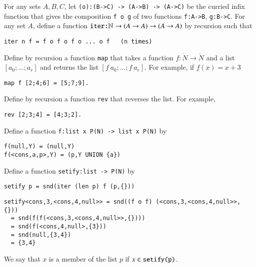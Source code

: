 \begin{exer}\label{ex:iter}  For any sets $A,B,C$, let \verb!(o):(B->C) -> (A->B) -> (A->C)! be the curried infix function that gives the composition \verb!f o g! of two functions \verb!f:A->B!, \verb!g:B->C!.  For any set $A$, define a function $\verb!iter:!\ring{N} \to (A\to A)\to(A\to A)$ by recursion such that
\begin{verbatim}
iter n f = f o f o f o ... o f   (n times)
\end{verbatim}
\end{exer}

\begin{exer} Define by recursion a function \verb!map! that takes a function $f:\ring{N}\to \ring{N}$ and a list $[a_0;\ldots;a_r]$ and returns the list
$[f~a_0;\ldots;f~a_r]$.
For example, if $f(x) = x+3$
\begin{verbatim}
map f [2;4;6] = [5;7;9].
\end{verbatim}
\end{exer}

\begin{exer} Define by recursion a function \verb!rev! that reverses the list.  For example,
\begin{verbatim}
rev [2;3;4] = [4;3;2].
\end{verbatim}
\end{exer}



\begin{definition}[setify]
Define a function \verb!f:list x P(N) -> list x P(N)! by
\begin{verbatim}
f(null,Y) = (null,Y)
f(<cons,a,p>,Y) = (p,Y UNION {a})
\end{verbatim}
Define a function \verb!setify:list -> P(N)! by
\begin{verbatim}
setify p = snd(iter (len p) f (p,{}))
\end{verbatim}
\end{definition}

\begin{example}
\begin{verbatim}
setify<cons,3,<cons,4,null>> = snd((f o f) (<cons,3,<cons,4,null>>,{})) 
  = snd(f(f(<cons,3,<cons,4,null>>,{}))) 
  = snd(f(<cons,4,null>,{3}))
  = snd(null,{3,4})
  = {3,4}
\end{verbatim}
\end{example}

We say that $x$ is a member of the  list $p$ if $x\in\verb!setify(p)!$.


